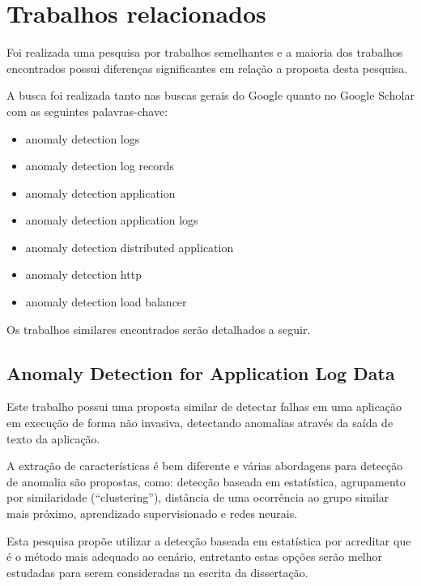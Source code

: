 
\chapter{Trabalhos relacionados}
\label{cap:trabalhos-relacionados}

Foi realizada uma pesquisa por trabalhos semelhantes e a maioria dos trabalhos
encontrados possui diferenças significantes em relação a proposta desta pesquisa.

A busca foi realizada tanto nas buscas gerais do Google quanto no Google Scholar
com as seguintes palavras-chave:

\begin{itemize}
  \item anomaly detection logs
  \item anomaly detection log records
  \item anomaly detection application
  \item anomaly detection application logs
  \item anomaly detection distributed application
  \item anomaly detection http
  \item anomaly detection load balancer
\end{itemize}

Os trabalhos similares encontrados serão detalhados a seguir.

\section{Anomaly Detection for Application Log Data \citep{grover}}
\label{sec:anomaly-detection-for-application-log-data}

Este trabalho possui uma proposta similar de detectar falhas em uma aplicação em
execução de forma não invasiva, detectando anomalias através da saída de texto
da aplicação.

A extração de características é bem diferente e várias abordagens para detecção
de anomalia são propostas, como: detecção baseada em estatística, agrupamento por
similaridade (``clustering''), distância de uma ocorrência ao grupo similar mais
próximo, aprendizado supervisionado e redes neurais.

Esta pesquisa propõe utilizar a detecção baseada em estatística por acreditar que
é o método mais adequado ao cenário, entretanto estas opções serão melhor estudadas
para serem consideradas na escrita da dissertação.

